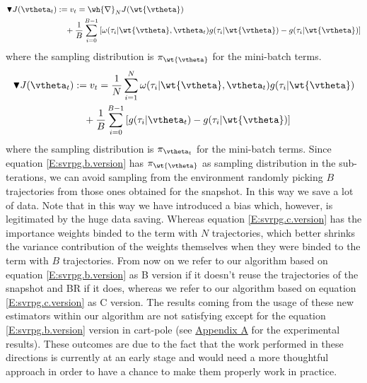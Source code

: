 \begin{align}\label{E:svrpg.b.version}
	\blacktriangledown J(\vtheta_{t}) &:= v_t= \wh{\nabla}_N J(\wt{\vtheta})\\ \notag
	& \quad{} + 
		\frac{1}{B} \sum_{i=0}^{B-1} \left[
		\omega(\tau_i|\wt{\vtheta}, \vtheta_t)g(\tau_i|\wt{\vtheta}) - g(\tau_i|\wt{\vtheta})
		\right]
\end{align}
where the sampling distribution is $\pi_{\wt{\vtheta}}$ for the mini-batch terms.
\begin{align}\label{E:svrpg.c.version}
	\blacktriangledown J(\vtheta_{t}) &:= v_t= \frac{1}{N}\sum_{i=1}^{N} \omega(\tau_i|\wt{\vtheta}, \vtheta_t)g(\tau_i|\wt{\vtheta})\\\notag & \quad{} + 
		\frac{1}{B} \sum_{i=0}^{B-1} \left[
		g(\tau_i|\vtheta_t) - g(\tau_i|\wt{\vtheta})
		\right]
\end{align}
where the sampling distribution is $\pi_{\vtheta_t}$ for the mini-batch terms.\newline
Since equation \ref{E:svrpg.b.version} has $\pi_{\wt{\vtheta}}$ as sampling distribution in the sub-terations, we can avoid sampling from the environment randomly picking $B$ trajectories from those ones obtained for the snapshot. In this way we save a lot of data. Note that in this way we have introduced a bias which, however, is legitimated by the huge data saving. Whereas equation \ref{E:svrpg.c.version} has the importance weights binded to the term with $N$ trajectories, which better shrinks the variance contribution of the weights themselves \wrt when they were binded to the term with $B$ trajectories. From now on we refer to our algorithm based on equation \ref{E:svrpg.b.version} as B version if it doesn't reuse the trajectories of the snapshot and BR if it does, whereas we refer to our algorithm based on equation \ref{E:svrpg.c.version} as C version.\newline
The results coming from the usage of these new estimators within our algorithm are not satisfying except for the equation \ref{E:svrpg.b.version} version in cart-pole (see \hyperref[chap:appendix]{Appendix A} for the experimental results). These outcomes are due to the fact that the work performed in these directions is currently at an early stage and would need a more thoughtful approach in order to have a chance to make them properly work in practice.

\vspace{-0.05in}